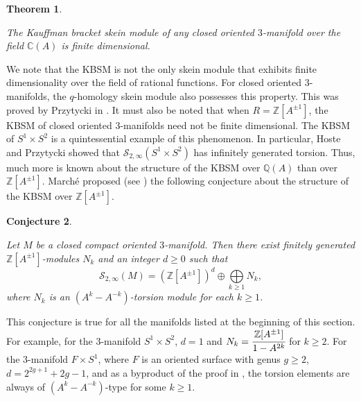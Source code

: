 \documentclass[12pt]{amsproc}
\newtheorem{theorem}{Theorem}[section]
\newtheorem{conjecture}[theorem]{Conjecture}
\begin{document}
\begin{theorem}\cite{wittenresolved}\label{wittenresolved}

The Kauffman bracket skein module of any closed oriented $3$-manifold over the field $\mathbb{C}(A)$ is finite dimensional. 

\end{theorem}

We note that the KBSM is not the only skein module that exhibits finite dimensionality over the field of rational functions. For closed oriented $3$-manifolds, the $q$-homology skein module also possesses this property. This was proved by Przytycki in \cite{qanalogue}.  %
It must also be noted that when $R = \mathbb{Z}[A^{\pm 1}]$, the KBSM of closed oriented $3$-manifolds need not be finite dimensional. The KBSM of $S^1 \times S^2$ is a quintessential example of this phenomenon. In particular, Hoste and Przytycki \cite{s1s2} showed that $\mathcal S_{2,\infty}(S^1 \times S^2)$ has infinitely generated torsion. Thus, much more is known about the structure of the KBSM over $\mathbb Q(A)$ than over $\mathbb Z[A^{\pm 1}]$. March\'e proposed (see \cite{basissurfacetimess1}) the following conjecture about the structure of the KBSM over $\mathbb{Z}[A^{\pm 1}]$. 

\begin{conjecture}\label{marcheconj}

Let $M$ be a closed compact oriented $3$-manifold. Then there exist finitely generated $\mathbb{Z}[A^{\pm 1}]$-modules $N_k$ and an integer $d \geq 0$ such that 
$$\mathcal S_{2, \infty}(M)= (\mathbb{Z}[A^{\pm 1}])^d \oplus \bigoplus \limits_{k \geq 1} N_k,$$ where $N_k$ is an $(A^k - A^{-k})$-torsion module for each $k \geq 1$. 

\end{conjecture}  

This conjecture is true for all the manifolds listed at the beginning of this section. For example, for the $3$-manifold $S^1 \times S^2$, $d = 1$ and $N_k = \cfrac{\mathbb{Z}[A^{\pm 1}]}{1 - A^{2k}}$ for $k\geq 2$. For the $3$-manifold $F \times S^1$, where $F$ is an oriented surface with genus $g\geq 2$, $d = 2^{2g+1}+2g -1$, and as a byproduct of the proof in \cite{basissurfacetimess1}, the torsion elements are always of $(A^k - A^{-k})$-type for some $k \geq 1$.
\end{document}
